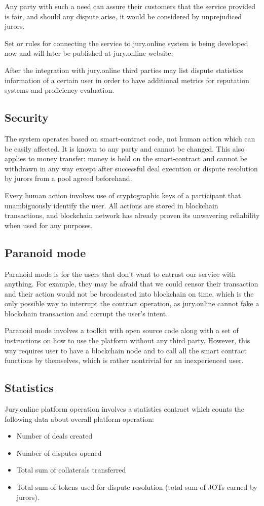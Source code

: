 \documentclass[12pt]{article}
\begin{document}
Any party with such a need can assure their customers that the service provided is fair, and should any dispute arise, it would be
considered by unprejudiced jurors. 

Set or rules for connecting the service to jury.online system is being developed now and will later be published at jury.online website.

After the integration with jury.online third parties may list dispute statistics information of a certain user in order to have additional
metrics for reputation systems and proficiency evaluation. 

\subsection{Security}
The system operates based on smart-contract code, not human action which can be easily affected. It is known to any party and cannot be
changed. This also applies to money transfer: money is held on the smart-contract and cannot be withdrawn in any way except after successful
deal execution or dispute resolution by jurors from a pool agreed beforehand.

Every human action involves use of cryptographic keys of a participant that unambiguously identify the user. All actions are stored in
blockchain transactions, and blockchain network has already proven its unwavering reliability when used for any purposes.

\subsection{Paranoid mode}
Paranoid mode is for the users that don’t want to entrust our service with anything. For example, they may be afraid that we could censor
their transaction and their action would not be broadcasted into blockchain on time, which is the only possible way to interrupt the
contract operation, as jury.online cannot fake a blockchain transaction and corrupt the user’s intent.

Paranoid mode involves a toolkit with open source code along with a set of instructions on how to use the platform without any third party.
However, this way requires user to have a blockchain node and to call all the smart contract functions by themselves, which is rather
nontrivial for an inexperienced user.
\subsection{Statistics}
Jury.online platform operation involves a statistics contract which counts the following data about overall platform operation:
\begin{itemize}
		\item Number of deals created
		\item Number of disputes opened
		\item Total sum of collaterals transferred 
		\item Total sum of tokens used for dispute resolution (total sum of JOTs earned by jurors).
\end{itemize}
\end{document}
